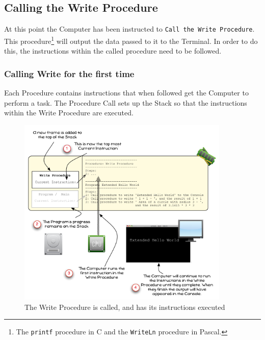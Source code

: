 
\clearpage
\subsection{Calling the Write Procedure} %
\label{sub:calling_a_procedure}

At this point the Computer has been instructed to \texttt{Call the Write Procedure}. This procedure\footnote{The \texttt{printf} procedure in C and the \texttt{WriteLn} procedure in Pascal.} will output the data passed to it to the Terminal. In order to do this, the instructions within the called procedure need to be followed.

\subsubsection{Calling Write for the first time} %
\label{ssub:calling_write_for_the_first_time}

Each Procedure contains instructions that when followed get the Computer to perform a task. The Procedure Call sets up the Stack so that the instructions within the Write Procedure are executed.

\begin{figure}[htbp]
   \centering
   \includegraphics[width=0.9\textwidth]{./topics/program-creation/images/ProgramExecution05} 
   \caption{The Write Procedure is called, and has its instructions executed}
   \label{fig:program-creation-visualise-helloworld-5}
\end{figure}

